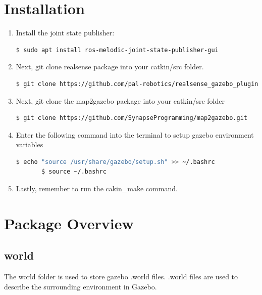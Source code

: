\documentclass[11pt]{article}
\begin{document}
\section{Installation}
\begin{enumerate}
 \item{Install the joint state publisher:
       \begin{lstlisting}[language=bash]
               $ sudo apt install ros-melodic-joint-state-publisher-gui
       \end{lstlisting}
       }
 \item{
       Next, git clone realsense package into your catkin/src folder.
       
       \begin{lstlisting}[language=bash]
       $ git clone https://github.com/pal-robotics/realsense_gazebo_plugin.git
       \end{lstlisting}
       }
       
 \item{
       Next, git clone the map2gazebo package into your catkin/src folder
       
       \begin{lstlisting}[language=bash]
       $ git clone https://github.com/SynapseProgramming/map2gazebo.git
       \end{lstlisting}
       }
       
       
 \item{
       Enter the following command into the terminal to setup gazebo environment variables
       \begin{lstlisting}[language=bash]
       $ echo "source /usr/share/gazebo/setup.sh" >> ~/.bashrc
       $ source ~/.bashrc
       \end{lstlisting}
       
       }
 \item{
       Lastly, remember to run the cakin\_make command.
       }
       
\end{enumerate}

\section{Package Overview}
\subsection{world}
The world folder is used to store gazebo .world files. .world files are used to describe the surrounding environment in Gazebo.
\end{document}
